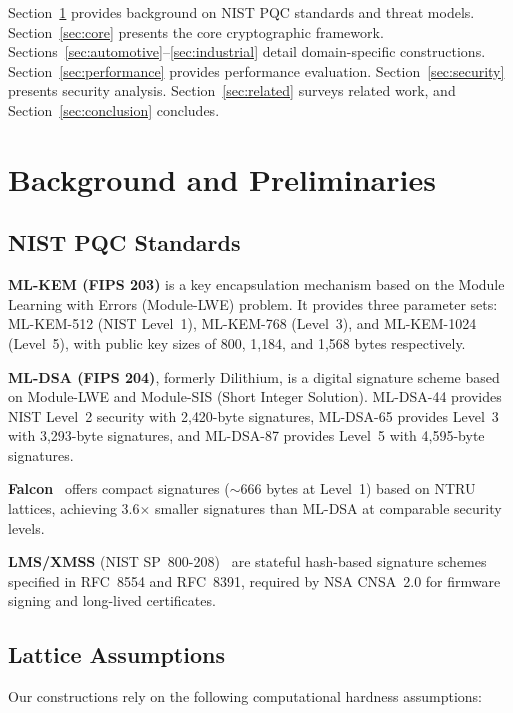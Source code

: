 \documentclass[conference,10pt]{IEEEtran}
\begin{document}
Section~\ref{sec:background} provides background on NIST PQC standards and threat models. Section~\ref{sec:core} presents the core cryptographic framework. Sections~\ref{sec:automotive}--\ref{sec:industrial} detail domain-specific constructions. Section~\ref{sec:performance} provides performance evaluation. Section~\ref{sec:security} presents security analysis. Section~\ref{sec:related} surveys related work, and Section~\ref{sec:conclusion} concludes.

\section{Background and Preliminaries}
\label{sec:background}

\subsection{NIST PQC Standards}

\textbf{ML-KEM (FIPS 203)} is a key encapsulation mechanism based on the Module Learning with Errors (Module-LWE) problem. It provides three parameter sets: ML-KEM-512 (NIST Level~1), ML-KEM-768 (Level~3), and ML-KEM-1024 (Level~5), with public key sizes of 800, 1{,}184, and 1{,}568 bytes respectively.

\textbf{ML-DSA (FIPS 204)}, formerly Dilithium, is a digital signature scheme based on Module-LWE and Module-SIS (Short Integer Solution). ML-DSA-44 provides NIST Level~2 security with 2{,}420-byte signatures, ML-DSA-65 provides Level~3 with 3{,}293-byte signatures, and ML-DSA-87 provides Level~5 with 4{,}595-byte signatures.

\textbf{Falcon}~\cite{falcon} offers compact signatures ($\sim$666 bytes at Level~1) based on NTRU lattices, achieving 3.6$\times$ smaller signatures than ML-DSA at comparable security levels.

\textbf{LMS/XMSS} (NIST SP~800-208)~\cite{sp800208} are stateful hash-based signature schemes specified in RFC~8554 and RFC~8391, required by NSA CNSA~2.0 for firmware signing and long-lived certificates.

\subsection{Lattice Assumptions}

Our constructions rely on the following computational hardness assumptions:
\end{document}
